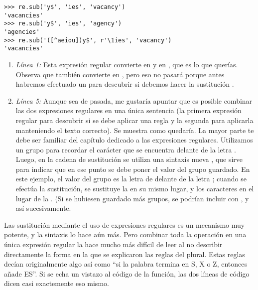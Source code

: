 \noindent\begin{minipage}{\textwidth}
\begin{lstlisting}[mathescape=False]
>>> re.sub('y$', 'ies', 'vacancy')
'vacancies'
>>> re.sub('y$', 'ies', 'agency')
'agencies'
>>> re.sub('([^aeiou])y$', r'\1ies', 'vacancy')
'vacancies'
\end{lstlisting}
\end{minipage}

\begin{enumerate}

\item \emph{Línea 1:} Esta expresión regular convierte  en  y  en , que es lo que querías. Observa que también convierte  en , pero eso no pasará porque antes habremos efectuado un  para descubrir si debemos hacer la sustitución .

\item \emph{Línea 5:} Aunque sea de pasada, me gustaría apuntar que es posible combinar las dos expresiones regulares en una única sentencia (la primera expresión regular para descubrir si se debe aplicar una regla y la segunda para aplicarla manteniendo el texto correcto). Se muestra como quedaría. La mayor parte te debe ser familiar del capítulo dedicado a las expresiones regulares. Utilizamos un grupo para recordar el carácter que se encuentra delante de la letra . Luego, en la cadena de sustitución se utiliza una sintaxis nueva , que sirve para indicar que en ese punto se debe poner el valor del grupo guardado. En este ejemplo, el valor del grupo es la letra  de delante de la letra ; cuando se efectúa la sustitución, se sustituye la  en su mismo lugar, y los caracteres  en el lugar de la . (Si se hubiesen guardado más grupos, se podrían incluir con ,  y así sucesivamente.

\end{enumerate}

Las sustitución mediante el uso de expresiones regulares es un mecanismo muy potente, y la sintaxis  lo hace aún más. Pero combinar toda la operación en una única expresión regular la hace mucho más difícil de leer al no describir directamente la forma en la que se explicaron las reglas del plural. Estas reglas decían originalmente algo así como ``si la palabra termina en S, X o Z, entonces añade ES''. Si se echa un vistazo al código de la función, las dos líneas de código dicen casi exactemente eso mismo.

